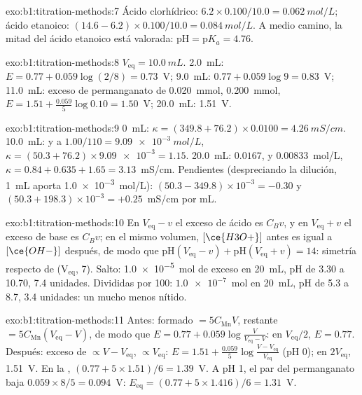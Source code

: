 \begin{solution}{exo:b1:titration-methods:7}
Ácido clorhídrico: $6.2 \times 0.100/10.0 = \qty{0.062}{mol/L}$; ácido
etanoico: $(14.6 - 6.2) \times 0.100/10.0 = \qty{0.084}{mol/L}$. A medio
camino, la mitad del ácido etanoico está valorada:
$\mathrm{pH} = \mathrm{p}K_a = 4.76$.
\end{solution}

\begin{solution}{exo:b1:titration-methods:8}
$V_{\mathrm{eq}} = \qty{10.0}{mL}$. 2.0~mL: $E = 0.77 + 0.059\log(2/8) =
0.73$~V; 9.0~mL: $0.77 + 0.059\log 9 = 0.83$~V; 11.0~mL: exceso de
permanganato de \qty{0.020}{mmol},  \qty{0.200}{mmol}, $E = 1.51 +
\frac{0.059}{5}\log 0.10 = 1.50$~V; 20.0~mL: 1.51~V.
\end{solution}

\begin{solution}{exo:b1:titration-methods:9}
0~mL: $\kappa = (349.8 + 76.2) \times 0.0100 = \qty{4.26}{mS/cm}$.
10.0~mL:  y  a $1.00/110 = \qty{9.09e-3}{mol/L}$,
$\kappa = (50.3 + 76.2) \times \num{9.09e-3} = 1.15$. 20.0~mL: 
$0.0167$,  y  $0.00833$~mol/L, $\kappa = 0.84 + 0.635 + 1.65
= 3.13$~mS/cm. Pendientes (despreciando la dilución, \qty{1}{mL} aporta
\qty{1.0e-3}{mol/L}): $(50.3 - 349.8) \times 10^{-3} = -0.30$ y
$(50.3 + 198.3) \times 10^{-3} = +0.25$~mS/cm por mL.
\end{solution}

\begin{solution}{exo:b1:titration-methods:10}
En $V_{\mathrm{eq}} - v$ el exceso de ácido es $C_Bv$, y en
$V_{\mathrm{eq}} + v$ el exceso de base es $C_Bv$; en el mismo volumen,
$[\ce{H3O+}]$ antes es igual a $[\ce{OH-}]$ después, de modo que
$\mathrm{pH}(V_{\mathrm{eq}} - v) +
\mathrm{pH}(V_{\mathrm{eq}} + v) = 14$: simetría respecto de
(V$_{\mathrm{eq}}$, 7). Salto: \qty{1.0e-5}{mol} de exceso en
\qty{20}{mL}, pH de 3.30 a 10.70, 7.4 unidades. Divididas por 100:
$\num{1.0e-7}$~mol en \qty{20}{mL}, pH de 5.3 a 8.7, 3.4 unidades: un
 mucho menos nítido.
\end{solution}

\begin{solution}{exo:b1:titration-methods:11}
Antes:  formado $= 5C_{\mathrm{Mn}}V$,  restante $=
5C_{\mathrm{Mn}}(V_{\mathrm{eq}} - V)$, de modo que $E = 0.77 + 0.059\log\frac{V}{V_{\mathrm{eq}}
- V}$: en $V_{\mathrm{eq}}/2$, $E = 0.77$. Después: exceso de 
$\propto
V - V_{\mathrm{eq}}$,  $\propto V_{\mathrm{eq}}$: $E = 1.51 +
\frac{0.059}{5}\log\frac{V - V_{\mathrm{eq}}}{V_{\mathrm{eq}}}$ (pH 0); en
$2V_{\mathrm{eq}}$, 1.51~V. En la , $(0.77 + 5 \times 1.51)/6 =
1.39$~V. A pH 1, el par del permanganato baja $0.059 \times 8/5 =
0.094$~V: $E_{\mathrm{eq}} = (0.77 + 5 \times 1.416)/6 = 1.31$~V.
\end{solution}

